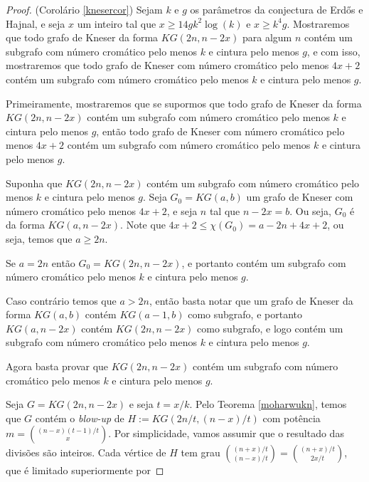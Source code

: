 \begin{proof}{(Corolário \ref{knesercor})}
Sejam $k$ e $g$ os parâmetros da conjectura de Erd\H{o}s e Hajnal, e seja $x$ um inteiro tal que $x \geq 14gk^2\log(k)$ e $x\geq k^4g$. Mostraremos que todo grafo de Kneser da forma $KG(2n, n-2x)$ para algum $n$ contém um subgrafo com número cromático pelo menos $k$ e cintura pelo menos $g$, e com isso, mostraremos que todo grafo de Kneser com número cromático pelo menos $4x+2$ contém um subgrafo com número cromático pelo menos $k$ e cintura pelo menos $g$.

Primeiramente, mostraremos que se supormos que todo grafo de Kneser da forma $KG(2n,n-2x)$ contém um subgrafo com número cromático pelo menos $k$ e cintura pelo menos $g$, então todo grafo de Kneser com número cromático pelo menos $4x+2$ contém um subgrafo com número cromático pelo menos $k$ e cintura pelo menos $g$.

Suponha que $KG(2n,n-2x)$ contém um subgrafo com número cromático pelo menos $k$ e cintura pelo menos $g$. Seja $G_0 = KG(a,b)$ um grafo de Kneser com número cromático pelo menos $4x+2$, e seja $n$ tal que $n-2x = b$. Ou seja, $G_0$ é da forma $KG(a,n-2x)$. Note que $4x+2\leq\chi(G_0) = a-2n+4x+2$, ou seja, temos que $a\geq 2n$.

Se $a = 2n$ então $G_0 = KG(2n,n-2x)$, e portanto contém um subgrafo com número cromático pelo menos $k$ e cintura pelo menos $g$.

Caso contrário temos que $a > 2n$, então basta notar que um grafo de Kneser da forma $KG(a,b)$ contém $KG(a-1,b)$ como subgrafo, e portanto $KG(a,n-2x)$ contém $KG(2n, n-2x)$ como subgrafo, e logo contém um subgrafo com número cromático pelo menos $k$ e cintura pelo menos $g$.

Agora basta provar que $KG(2n,n-2x)$ contém um subgrafo com número cromático pelo menos $k$ e cintura pelo menos $g$.

 


Seja $G = KG(2n,n-2x)$ e seja $t = x/k$. Pelo Teorema \ref{moharwukn}, temos que $G$ contém o \textit{blow-up} de $H := KG(2n/t, (n-x)/t)$ com potência~$m = \binom{(n-x)(t-1)/t}{x}$. Por simplicidade, vamos assumir que o resultado das divisões são inteiros. Cada vértice de $H$ tem grau $\binom{(n+x)/t}{(n-x)/t} = \binom{(n+x)/t}{2x/t}$, que é limitado superiormente por


\end{proof}
